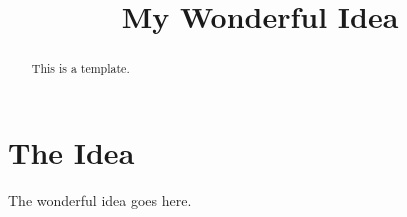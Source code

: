 \documentclass[10pt]{sosp2015}
\title{My Wonderful Idea}
\begin{document}

\maketitle                   %

\begin{abstract}
This is a template.
\end{abstract}

\section{The Idea}
The wonderful idea goes here.


%
\end{document}
